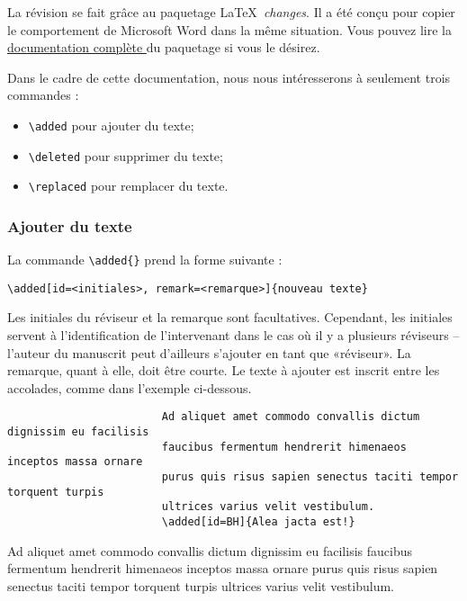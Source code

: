 \documentclass[french]{article}
\newcommand{\cmd}[1]{%
	\texttt{\textbackslash#1\{\}}
}
\newcommand{\dec}[1]{%
	\texttt{\textbackslash#1}
}
\newcommand{\lien}[2]{%
	\href{#1}{#2 \faIcon{external-link-alt}}
}
\begin{document}
			La révision se fait grâce au paquetage \LaTeX\ \emph{changes}. Il a été conçu pour copier le comportement de Microsoft Word dans la même situation. Vous pouvez lire la
			\lien{http://mirrors.ctan.org/macros/latex/contrib/changes/changes.english.pdf}{documentation complète} du
			paquetage si vous le désirez. 
			
			Dans le cadre de cette documentation, nous nous intéresserons à seulement trois commandes :
			
			\begin{itemize}
				\item \dec{added} pour ajouter du texte;
				\item \dec{deleted} pour supprimer du texte;
				\item \dec{replaced} pour remplacer du texte.
			\end{itemize}
		
			\subsubsection{Ajouter du texte}
			
				La commande \cmd{added} prend la forme suivante :
				
				\begin{shaded*}
					\verb|\added[id=<initiales>, remark=<remarque>]{nouveau texte}|
				\end{shaded*}
			
				Les initiales du réviseur et la remarque sont facultatives. Cependant, les initiales servent à l'identification
				de l'intervenant dans le cas où il y a plusieurs réviseurs -- l'auteur du manuscrit peut d'ailleurs s'ajouter en
				tant que «réviseur». La remarque, quant à elle, doit être courte. Le texte à ajouter est inscrit entre les accolades, comme dans l'exemple ci-dessous.
				
				\begin{shaded*}
					\begin{verbatim}
						Ad aliquet amet commodo convallis dictum dignissim eu facilisis 
						faucibus fermentum hendrerit himenaeos inceptos massa ornare 
						purus quis risus sapien senectus taciti tempor torquent turpis 
						ultrices varius velit vestibulum.
						\added[id=BH]{Alea jacta est!}
					\end{verbatim}
				\end{shaded*}
			
				\begin{leftbar}
					Ad aliquet amet commodo convallis dictum dignissim eu facilisis 
					faucibus fermentum hendrerit himenaeos inceptos massa ornare 
					purus quis risus sapien senectus taciti tempor torquent turpis 
					ultrices varius velit vestibulum.
				\end{leftbar}
			
\end{document}
